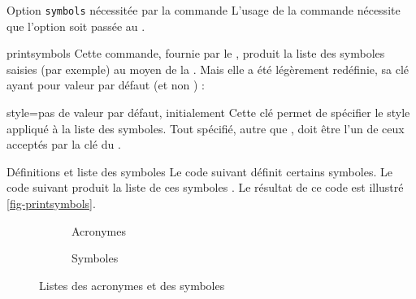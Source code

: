 \begin{dbwarning}{Option \texttt{symbols} nécessitée par la commande
    \protect{}}{}
  L'usage de la commande  nécessite que l'option
   soit passée au .
\end{dbwarning}

\begin{docCommand}{printsymbols}{}
  Cette commande, fournie par le , produit la liste des
  symboles saisies (par exemple) au moyen de la . Mais
  elle a été légèrement redéfinie, sa clé  ayant pour valeur par
  défaut  (et non ) :
  \begin{docKey}{style}{=\textbar{}}{pas de valeur
      par défaut, initialement }
    Cette clé permet de spécifier le style appliqué à la liste des
    symboles. Tout  spécifié, autre que ,
    doit être l'un de ceux acceptés par la clé  du
    .
  \end{docKey}
\end{docCommand}

\begin{dbexample}{Définitions et liste des symboles}{}
  Le code suivant définit certains symboles.
  Le code suivant produit la liste de ces symboles .
   Le résultat de ce
  code est illustré \vref{fig-printsymbols}.
\end{dbexample}

\begin{landscape}
  \begin{figure}[p]
    \centering
    \begin{subfigure}[b]{.45\linewidth}
      \centering
      \caption{Acronymes}
      \label{fig-printacronyms}
    \end{subfigure}%
    \begin{subfigure}[b]{.45\linewidth}
      \centering
      \caption{Symboles}
      \label{fig-printsymbols}
    \end{subfigure}%
    \caption{Listes des acronymes et des symboles}
    \label{fig-printacronyms-printsymbols}
  \end{figure}
\end{landscape}

